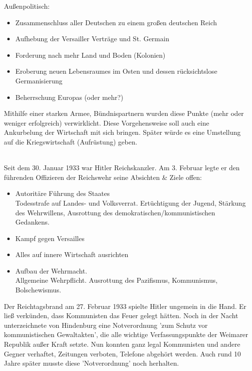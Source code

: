 \documentclass[letterpaper, 12pt]{article}
\begin{document}
Außenpolitisch:

\begin{itemize}
	\item Zusammenschluss aller Deutschen zu einem großen deutschen Reich
    \item Aufhebung der Versailler Verträge und St. Germain
    \item Forderung nach mehr Land und Boden (Kolonien)
    \item Eroberung neuen Lebensraumes im Osten und dessen rücksichtslose Germanisierung
    \item Beherrschung Europas (oder mehr?)
\end{itemize}

Mithilfe einer starken Armee, Bündnispartnern wurden diese Punkte (mehr oder weniger erfolgreich) verwirklicht. Diese Vorgehensweise soll auch eine Ankurbelung der Wirtschaft mit sich bringen. Später würde es eine Umstellung auf die Kriegswirtschaft (Aufrüstung) geben. 

\\
Seit dem 30. Januar 1933 war Hitler Reichskanzler. Am 3. Februar legte er den führenden Offizieren der Reichswehr seine Absichten \& Ziele offen:

\begin{itemize}
	\item Autoritäre Führung des Staates \\
	Todesstrafe auf Landes- und Volksverrat. Ertüchtigung der Jugend, Stärkung des Wehrwillens, Ausrottung des demokratischen/kommunistischen Gedankens.
	\item Kampf gegen Versailles
	\item Alles auf innere Wirtschaft ausrichten
	\item Aufbau der Wehrmacht. \\
	Allgemeine Wehrpflicht. Ausrottung des Pazifismus, Kommunismus, Bolschewismus.
\end{itemize}

Der Reichtagsbrand am 27. Februar 1933 spielte Hitler ungemein in die Hand. Er ließ verkünden, dass Kommunisten das Feuer gelegt hätten. Noch in der Nacht unterzeichnete von Hindenburg eine Notverordnung 'zum Schutz vor kommunistischen Gewaltakten', die alle wichtige Verfassungspunkte der Weimarer Republik außer Kraft setzte. Nun konnten ganz legal Kommunisten und andere Gegner verhaftet, Zeitungen verboten, Telefone abgehört werden. Auch rund 10 Jahre später musste diese 'Notverordnung' noch herhalten.
\end{document}
